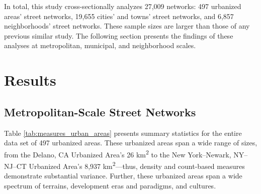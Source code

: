 \documentclass[11pt]{article}
\begin{document}
\begin{multicols}{2}
In total, this study cross-sectionally analyzes 27,009 networks: 497 urbanized areas' street networks, 19,655 cities' and towns' street networks, and 6,857 neighborhoods' street networks. These sample sizes are larger than those of any previous similar study. The following section presents the findings of these analyses at metropolitan, municipal, and neighborhood scales.


\section{Results}

\subsection{Metropolitan-Scale Street Networks}

Table \ref{tab:measures_urban_areas} presents summary statistics for the entire data set of 497 urbanized areas. These urbanized areas span a wide range of sizes, from the Delano, CA Urbanized Area's 26 km\textsuperscript{2} to the New York--Newark, NY--NJ--CT Urbanized Area's 8,937 km\textsuperscript{2}---thus, density and count-based measures demonstrate substantial variance. Further, these urbanized areas span a wide spectrum of terrains, development eras and paradigms, and cultures.


\end{multicols}
\end{document}
